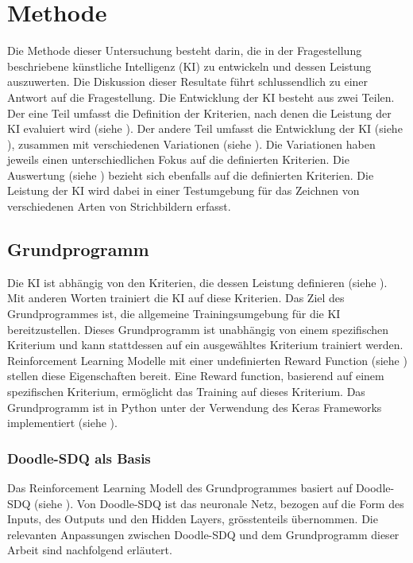 \chapter{Methode}\label{chap:m}
Die Methode dieser Untersuchung besteht darin, die in der Fragestellung
beschriebene künstliche Intelligenz (KI) zu entwickeln und dessen Leistung
auszuwerten. Die Diskussion dieser Resultate führt schlussendlich zu einer
Antwort auf die Fragestellung. Die Entwicklung der KI besteht aus zwei Teilen.
Der eine Teil umfasst die Definition der Kriterien, nach denen die Leistung der
KI evaluiert wird (siehe ). Der andere Teil umfasst die
Entwicklung der KI (siehe ), zusammen mit verschiedenen
Variationen (siehe ). Die Variationen haben jeweils einen
unterschiedlichen Fokus auf die definierten Kriterien. Die Auswertung (siehe
) bezieht sich ebenfalls auf die definierten
Kriterien. Die Leistung der KI wird dabei in einer Testumgebung für das Zeichnen
von verschiedenen Arten von Strichbildern erfasst.

\section{Grundprogramm}\label{chap:m_grund} Die KI ist abhängig von den
Kriterien, die dessen Leistung definieren (siehe ). Mit
anderen Worten trainiert die KI auf diese Kriterien. Das Ziel des
Grundprogrammes ist, die allgemeine Trainingsumgebung für die KI
bereitzustellen. Dieses Grundprogramm ist unabhängig von einem spezifischen
Kriterium und kann stattdessen auf ein ausgewähltes Kriterium trainiert werden.
Reinforcement Learning Modelle mit einer undefinierten Reward Function (siehe
) stellen diese Eigenschaften bereit. Eine Reward
function, basierend auf einem spezifischen Kriterium, ermöglicht das Training
auf dieses Kriterium. Das Grundprogramm ist in Python unter der Verwendung des
Keras Frameworks implementiert (siehe ). 

\subsection{Doodle-SDQ als Basis}\label{sub:m_grund_dood} Das Reinforcement
Learning Modell des Grundprogrammes basiert auf Doodle-SDQ (siehe
). Von Doodle-SDQ ist das neuronale Netz, bezogen auf
die Form des Inputs, des Outputs und den Hidden Layers, grösstenteils
übernommen. Die relevanten Anpassungen zwischen Doodle-SDQ und dem Grundprogramm
dieser Arbeit sind nachfolgend erläutert.

